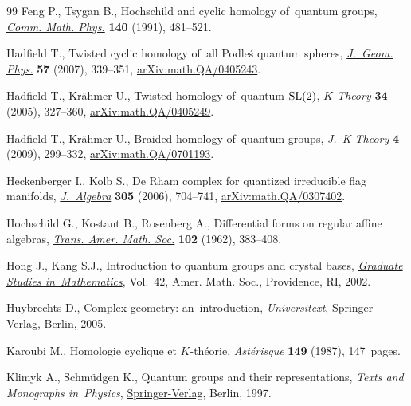 \documentclass[pdftex]{sigma}
\numberwithin{equation}{section}
\begin{document}
\begin{thebibliography}{99}
Feng P., Tsygan B., Hoch\-schild and cyclic homology of~quantum groups,
 \href{https://doi.org/doi.org/10.1007/BF02099132}{\textit{Comm. Math. Phys.}} \textbf{140} (1991), 481--521.

Hadfield T., Twisted cyclic homology of~all {P}odle\'{s} quantum spheres,
 \href{https://doi.org/10.1016/j.geomphys.2006.03.006}{\textit{J.~Geom. Phys.}} \textbf{57} (2007), 339--351,
 \href{https://arxiv.org/abs/math.QA/0405243}{arXiv:math.QA/0405243}.

Hadfield T., Kr\"ahmer U., Twisted homology of~quantum {${\rm SL}(2)$},
 \href{https://doi.org/10.1007/s10977-005-3118-2}{\textit{$K$-Theory}} \textbf{34} (2005), 327--360, \href{https://arxiv.org/abs/math.QA/0405249}{arXiv:math.QA/0405249}.

Hadfield T., Kr\"ahmer U., Braided homology of~quantum groups,
 \href{https://doi.org/10.1017/is008008021jkt063}{\textit{J.~K-Theory}} \textbf{4} (2009), 299--332, \href{https://arxiv.org/abs/math.QA/0701193}{arXiv:math.QA/0701193}.

Heckenberger I., Kolb S., De {R}ham complex for quantized irreducible flag
 manifolds, \href{https://doi.org/10.1016/j.jalgebra.2006.02.001}{\textit{J.~Algebra}} \textbf{305} (2006), 704--741,
 \href{https://arxiv.org/abs/math.QA/0307402}{arXiv:math.QA/0307402}.

Hoch\-schild G., Kostant B., Rosenberg A., Differential forms on regular affine
 algebras, \href{https://doi.org/10.2307/1993614}{\textit{Trans. Amer. Math. Soc.}} \textbf{102} (1962), 383--408.

Hong J., Kang S.J., Introduction to quantum groups and crystal bases,
 \href{https://doi.org/10.1090/gsm/042}{\textit{Graduate Studies in~Mathematics}}, Vol.~42, Amer. Math. Soc.,
 Providence, RI, 2002.

Huybrechts D., Complex geometry: an~introduction, \textit{Universitext},
 \href{https://doi.org/10.1007/b137952}{Springer-Verlag}, Berlin, 2005.

Karoubi M., Homologie cyclique et {$K$}-th\'eorie, \textit{Ast\'erisque}
 \textbf{149} (1987), 147~pages.

Klimyk A., Schm\"udgen K., Quantum groups and their representations, \textit{Texts and
 Monographs in~Physics}, \href{https://doi.org/10.1007/978-3-642-60896-4}{Springer-Verlag}, Berlin, 1997.


\end{thebibliography}
\end{document}
